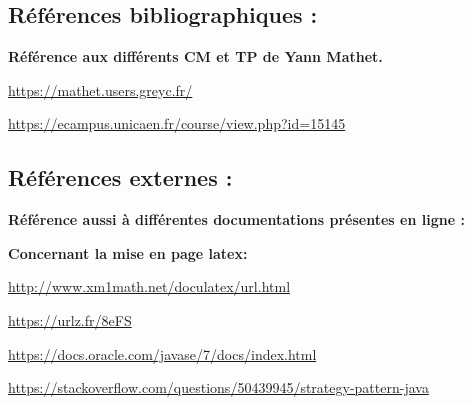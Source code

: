 \documentclass{article}
\begin{document}
\subsection{Références bibliographiques :}




\vspace{1\baselineskip}

\bf Référence aux différents CM et TP de Yann Mathet.

\vspace{0.5\baselineskip}

\url{https://mathet.users.greyc.fr/}

\vspace{0.3\baselineskip}

\url{https://ecampus.unicaen.fr/course/view.php?id=15145}

\vspace{0.5\baselineskip}

\subsection{Références externes :}

\vspace{1\baselineskip}

\bf Référence aussi à différentes documentations présentes en ligne :

\vspace{0.3\baselineskip}

\bf Concernant la mise en page latex:

\vspace{0.5\baselineskip}

\url{http://www.xm1math.net/doculatex/url.html}

\vspace{0.3\baselineskip}

\url{https://urlz.fr/8eFS}

\vspace{0.3\baselineskip}

\url{https://docs.oracle.com/javase/7/docs/index.html}

\vspace{0.3\baselineskip}

\url{https://stackoverflow.com/questions/50439945/strategy-pattern-java}

\vspace{0.3\baselineskip}
\end{document}
